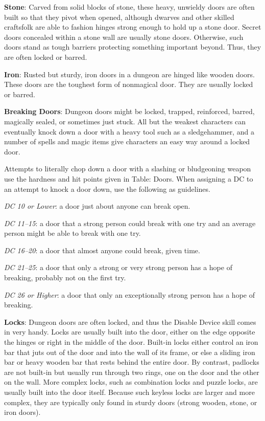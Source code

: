 \textbf{Stone}: Carved from solid blocks of stone, these heavy, unwieldy doors are often built so that they pivot when opened, although dwarves and other skilled craftsfolk are able to fashion hinges strong enough to hold up a stone door. Secret doors concealed within a stone wall are usually stone doors. Otherwise, such doors stand as tough barriers protecting something important beyond. Thus, they are often locked or barred.
				
\textbf{Iron}: Rusted but sturdy, iron doors in a dungeon are hinged like wooden doors. These doors are the toughest form of nonmagical door. They are usually locked or barred.
				
\textbf{Breaking Doors}: Dungeon doors might be locked, trapped, reinforced, barred, magically sealed, or sometimes just stuck. All but the weakest characters can eventually knock down a door with a heavy tool such as a sledgehammer, and a number of spells and magic items give characters an easy way around a locked door.
				
Attempts to literally chop down a door with a slashing or bludgeoning weapon use the hardness and hit points given in Table: Doors. When assigning a DC to an attempt to knock a door down, use the following as guidelines.
				
\textit{DC 10 or Lower}: a door just about anyone can break open.
				
\textit{DC 11--15}: a door that a strong person could break with one try and an average person might be able to break with one try. 
				
\textit{DC 16--20}: a door that almost anyone could break, given time.
				
\textit{DC 21--25}: a door that only a strong or very strong person has a hope of breaking, probably not on the first try.
				
\textit{DC 26 or Higher}: a door that only an exceptionally strong person has a hope of breaking.
				
\textbf{Locks}: Dungeon doors are often locked, and thus the Disable Device skill comes in very handy. Locks are usually built into the door, either on the edge opposite the hinges or right in the middle of the door. Built-in locks either control an iron bar that juts out of the door and into the wall of its frame, or else a sliding iron bar or heavy wooden bar that rests behind the entire door. By contrast, padlocks are not built-in but usually run through two rings, one on the door and the other on the wall. More complex locks, such as combination locks and puzzle locks, are usually built into the door itself. Because such keyless locks are larger and more complex, they are typically only found in sturdy doors (strong wooden, stone, or iron doors).
				
